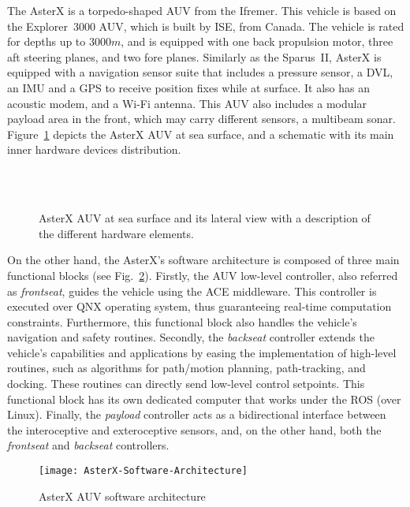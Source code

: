 The AsterX is a torpedo-shaped \ac{AUV} from the \acf{Ifremer}. This vehicle is
based on the Explorer~3000 \ac{AUV}, which is built by \ac{ISE}, from Canada.
The vehicle is rated for depths up to $3000 m$, and is equipped with one back
propulsion motor, three aft steering planes, and two fore planes. Similarly as
the Sparus~II, AsterX is equipped with a navigation sensor suite that includes a
pressure sensor, a \ac{DVL}, an \ac{IMU} and a GPS to receive position fixes
while at surface. It also has an acoustic modem, and a Wi-Fi antenna. This
\ac{AUV} also includes a modular payload area in the front, which may carry
different sensors, \eg a multibeam sonar. Figure~\ref{fig:AsterXFullViews}
depicts the AsterX \ac{AUV} at sea surface, and a schematic with its main inner
hardware devices distribution.

\begin{figure}[htbp]
    \myfloatalign
    \\
    \\ %
    \caption[AsterX AUV at sea surface and its lateral view with a description of the
    different hardware elements.]
    {AsterX AUV at sea surface and its lateral view with a description of the
    different hardware elements.}
    \label{fig:AsterXFullViews}
\end{figure}

On the other hand, the AsterX's software architecture is composed of
three main functional blocks (see Fig.~\ref{fig:HighLevelControArch}).  Firstly,
the \ac{AUV} low-level controller, also referred as \textit{frontseat}, guides
the vehicle using the \ac{ACE} middleware. This controller is executed over QNX
operating system, thus guaranteeing real-time computation constraints.
Furthermore, this functional block also handles the vehicle's navigation and
safety routines. Secondly, the \textit{backseat} controller extends the
vehicle's capabilities and applications by easing the implementation of
high-level routines, such as algorithms for path/motion planning, path-tracking,
and docking. These routines can directly send low-level control setpoints. This
functional block has its own dedicated computer that works under the \ac{ROS}
(over Linux). Finally, the \textit{payload} controller acts as a bidirectional
interface between the interoceptive and exteroceptive sensors, and, on the other
hand, both the \textit{frontseat} and \textit{backseat} controllers.

\begin{figure}[htbp] %
\centering
	\texttt{[image: AsterX-Software-Architecture]}
\caption[AsterX AUV software architecture.]
{AsterX \ac{AUV} software architecture}
\label{fig:HighLevelControArch}
\end{figure}

